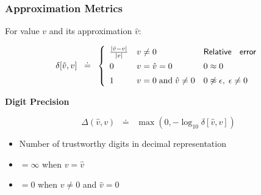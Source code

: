 \documentclass[t,pdf]{beamer}
\newcommand{\approximate}[1]{\hat{#1}}
\newcommand{\approxv}{\approximate{v}}
\newcommand{\aerror}{\delta}
\newcommand{\digitprecision}{\Delta}
\begin{document}
\begin{frame}
  \frametitle{Approximation Metrics}

For value $v$ and its approximation $\approxv$:

  \begin{displaymath}
\aerror[\approxv, v] \;\; \doteq \;\; \left\{ \begin{array}{lll}
  \frac{|\approxv - v|}{|v|}  & v \not = 0 & \textsf{Relative \; error}\\[0.5em]
  0 & v  = \approxv = 0 & 0 \approx 0\\[0.5em]
  1 & v = 0 \; \textrm{and} \; \approxv \not = 0 & 0 \not \approx \epsilon,\;\epsilon \not = 0
  \end{array} \right.
\end{displaymath}

\bigskip

\textbf{Digit Precision}

\begin{displaymath}
  \digitprecision(\approxv, v) \;\; \doteq \;\; \max(0, -\log_{10} \aerror[\approxv, v])
\end{displaymath}

\begin{itemize}
 \item Number of trustworthy digits in decimal representation
\item  $= \infty$ when $v = \approxv$
\item $= 0$ when $v \not = 0$ and $\approxv = 0$
\end{itemize}

\end{frame}
\end{document}
